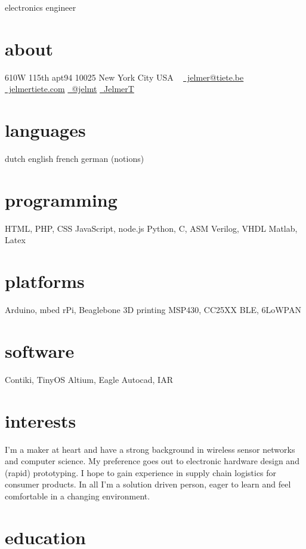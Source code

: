 \documentclass[print]{friggeri-cv}
\begin{document}
       {electronics engineer}


\begin{aside}
  \section{about}
    610W 115th apt94
    10025 New York City
    USA
    ~
    \href{mailto:jelmer@tiete.be}{\textcolor{textcolor}{\faEnvelopeAlt}~jelmer@tiete.be}
    \href{http://jelmertiete.com}{\textcolor{textcolor}{\faGlobe}~jelmertiete.com}
    \href{http://twitter.com/jelmt}{\textcolor{textcolor}{\faTwitter}~@jelmt}
    \href{https://github.com/JelmerT}{\textcolor{textcolor}{\faGithub}~JelmerT}
  \section{languages}
    dutch
    english
    french
    german (notions)
  \section{programming}
    HTML, PHP, CSS
    JavaScript, node.js
    Python, C, ASM
    Verilog, VHDL
    Matlab, Latex
  \section{platforms}
    Arduino, mbed
    rPi, Beaglebone
    3D printing
    MSP430, CC25XX
    BLE, 6LoWPAN
  \section{software}
    Contiki, TinyOS
    Altium, Eagle
    Autocad, IAR
\end{aside}

\section{interests}
I'm a maker at heart and have a strong background in wireless sensor networks and computer science. My preference goes out to electronic hardware design and (rapid) prototyping. I hope to gain experience in supply chain logistics for consumer products. In all I'm a solution driven person, eager to learn and feel comfortable in a changing environment.

\section{education}
\end{document}

